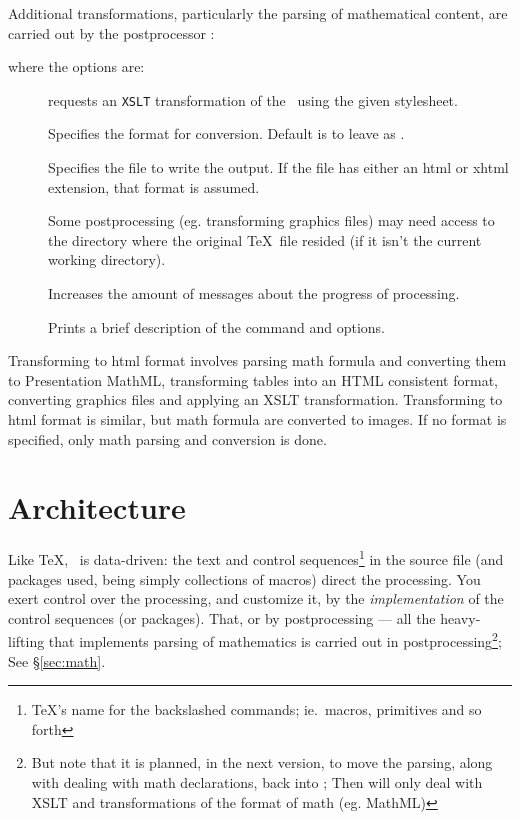 \documentclass{article}
\begin{document}
Additional transformations, particularly the parsing of mathematical content, are carried out
by the postprocessor :
\begin{quote}
\end{quote}
where the options are:
\begin{description}
\item[] requests an \texttt{XSLT} transformation of
    the \XML\  using the given stylesheet.
\item[]  Specifies the format for conversion. Default
    is to leave as \XML.
\item[]  Specifies the file to write the output.
    If the file has either an html or xhtml extension, that format is assumed.
\item[] Some postprocessing (eg. transforming graphics files)
     may need access to the directory  where the original \TeX\ file resided 
     (if it isn't the current working directory).
\item[] Increases the amount of messages about the progress of processing.
\item[] Prints a brief description of the command and options.
\end{description}
Transforming to html format involves parsing math formula and converting them to Presentation MathML,
transforming tables into an HTML consistent format, converting graphics files and applying 
an XSLT transformation.
Transforming to html format is similar, but math formula are converted to images.
If no format is specified, only math parsing and conversion is done.

\section{Architecture}\label{sec:architecture}
Like \TeX, \LaTeXML\ is data-driven: the text and control sequences\footnote{\TeX's name
for the backslashed commands; ie.~macros, primitives and so forth}
in the source file (and packages used, being simply collections of macros)
direct the processing.
You exert control over the processing, and customize it, by 
the \emph{implementation} of the control sequences (or packages).
That, or by postprocessing --- all the heavy-lifting that implements parsing 
of mathematics is carried out in postprocessing\footnote{But note that it is planned,
in the next version, to move the parsing, along with dealing with math declarations, 
back into ; Then  will only deal with XSLT and transformations
of the format of math (eg. MathML)}; See \S\ref{sec:math}.
\end{document}
